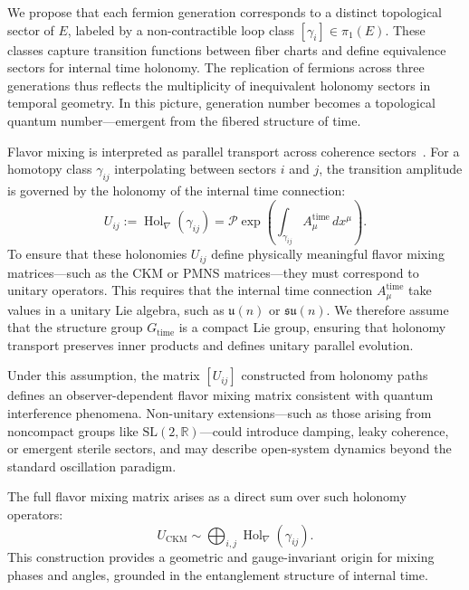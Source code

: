 \documentclass[11pt]{article}
\begin{document}
We propose that each fermion generation corresponds to a distinct topological sector of \( E \), labeled by a non-contractible loop class \( [\gamma_i] \in \pi_1(E) \). These classes capture transition functions between fiber charts and define equivalence sectors for internal time holonomy. The replication of fermions across three generations thus reflects the multiplicity of inequivalent holonomy sectors in temporal geometry. In this picture, generation number becomes a topological quantum number—emergent from the fibered structure of time.

Flavor mixing is interpreted as parallel transport across coherence sectors~\cite{tomaz2025rqd}. For a homotopy class \( \gamma_{ij} \) interpolating between sectors \( i \) and \( j \), the transition amplitude is governed by the holonomy of the internal time connection:
\begin{equation}
U_{ij} := \operatorname{Hol}_\nabla(\gamma_{ij}) = \mathcal{P} \exp \left( \int_{\gamma_{ij}} A^{\mathrm{time}}_\mu \, dx^\mu \right).
\end{equation}
To ensure that these holonomies \( U_{ij} \) define physically meaningful flavor mixing matrices—such as the CKM or PMNS matrices—they must correspond to unitary operators. This requires that the internal time connection \( A_\mu^{\text{time}} \) take values in a unitary Lie algebra, such as \( \mathfrak{u}(n) \) or \( \mathfrak{su}(n) \). We therefore assume that the structure group \( G_{\text{time}} \) is a compact Lie group, ensuring that holonomy transport preserves inner products and defines unitary parallel evolution.

Under this assumption, the matrix \( [U_{ij}] \) constructed from holonomy paths defines an observer-dependent flavor mixing matrix consistent with quantum interference phenomena. Non-unitary extensions—such as those arising from noncompact groups like \( \mathrm{SL}(2,\mathbb{R}) \)—could introduce damping, leaky coherence, or emergent sterile sectors, and may describe open-system dynamics beyond the standard oscillation paradigm.


The full flavor mixing matrix arises as a direct sum over such holonomy operators:
\begin{equation}
U_{\mathrm{CKM}} \sim \bigoplus_{i,j} \operatorname{Hol}_\nabla(\gamma_{ij}).
\end{equation}
This construction provides a geometric and gauge-invariant origin for mixing phases and angles, grounded in the entanglement structure of internal time.
\end{document}
